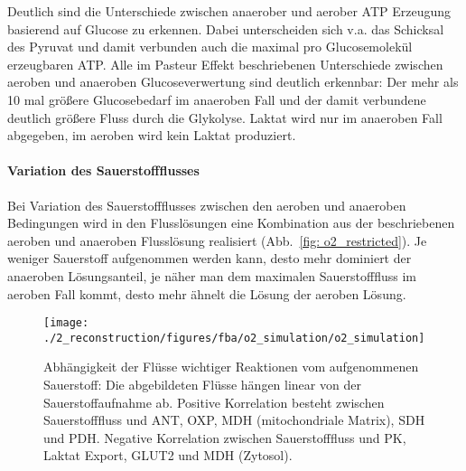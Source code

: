 Deutlich sind die Unterschiede zwischen anaerober und aerober ATP Erzeugung basierend auf Glucose zu erkennen. Dabei unterscheiden sich v.a. das Schicksal des Pyruvat und damit verbunden auch die maximal pro Glucosemolekül erzeugbaren ATP. Alle im Pasteur Effekt beschriebenen Unterschiede zwischen aeroben und anaeroben Glucoseverwertung sind deutlich erkennbar: Der mehr als 10 mal größere Glucosebedarf im anaeroben Fall und der damit verbundene deutlich größere Fluss durch die Glykolyse. Laktat wird nur im anaeroben Fall abgegeben, im aeroben wird kein Laktat produziert.

\paragraph{Variation des Sauerstoffflusses}
Bei Variation des Sauerstoffflusses zwischen den aeroben und anaeroben Bedingungen wird in den Flusslösungen eine Kombination aus der beschriebenen aeroben und anaeroben Flusslösung realisiert (Abb.~\ref{fig: o2_restricted}). Je weniger Sauerstoff aufgenommen werden kann, desto mehr dominiert der anaeroben Lösungsanteil, je näher man dem maximalen Sauerstofffluss im aeroben Fall kommt, desto mehr ähnelt die Lösung der aeroben Lösung.

\begin{figure}[!ht]
 \centering
 \texttt{[image: ./2\_reconstruction/figures/fba/o2\_simulation/o2\_simulation]}
 \caption{Abhängigkeit der Flüsse wichtiger Reaktionen vom aufgenommenen Sauerstoff: Die abgebildeten Flüsse hängen linear von der Sauerstoffaufnahme ab. Positive Korrelation besteht zwischen Sauerstofffluss und ANT, OXP, MDH (mitochondriale Matrix), SDH und PDH. Negative Korrelation zwischen Sauerstofffluss und PK, Laktat Export, GLUT2 und MDH (Zytosol).}
 \label{fig: o2_simulation}
\end{figure}


